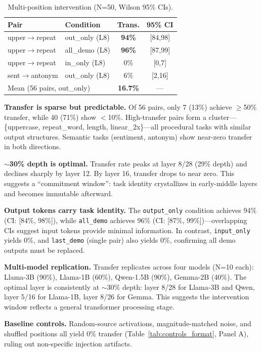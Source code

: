 \documentclass[sigconf,anonymous]{acmart}
\begin{document}
\begin{table}[t]
\caption{Multi-position intervention (N=50, Wilson 95\% CIs).}
\label{tab:multi}
\centering
\small
\begin{tabular}{@{}llcc@{}}
\toprule
Pair & Condition & Trans. & 95\% CI \\
\midrule
upper$\to$repeat & out\_only (L8) & \textbf{94\%} & [84,98] \\
upper$\to$repeat & all\_demo (L8) & \textbf{96\%} & [87,99] \\
upper$\to$repeat & in\_only (L8) & 0\% & [0,7] \\
sent$\to$antonym & out\_only (L8) & 6\% & [2,16] \\
\midrule
\multicolumn{2}{l}{Mean (56 pairs, out\_only)} & \textbf{16.7\%} & --- \\
\bottomrule
\end{tabular}
\end{table}

\textbf{Transfer is sparse but predictable.} Of 56 pairs, only 7 (13\%) achieve $\geq$50\% transfer, while 40 (71\%) show $<$10\%. High-transfer pairs form a cluster---\{uppercase, repeat\_word, length, linear\_2x\}---all procedural tasks with similar output structures. Semantic tasks (sentiment, antonym) show near-zero transfer in both directions.

\textbf{$\sim$30\% depth is optimal.} Transfer rate peaks at layer 8/28 (29\% depth) and declines sharply by layer 12. By layer 16, transfer drops to near zero. This suggests a ``commitment window'': task identity crystallizes in early-middle layers and becomes immutable afterward.

\textbf{Output tokens carry task identity.} The \texttt{output\_only} condition achieves 94\% (CI: [84\%, 98\%]), while \texttt{all\_demo} achieves 96\% (CI: [87\%, 99\%])---overlapping CIs suggest input tokens provide minimal information. In contrast, \texttt{input\_only} yields 0\%, and \texttt{last\_demo} (single pair) also yields 0\%, confirming all demo outputs must be replaced.

\textbf{Multi-model replication.} Transfer replicates across four models (N=10 each): Llama-3B (90\%), Llama-1B (60\%), Qwen-1.5B (90\%), Gemma-2B (40\%). The optimal layer is consistently at $\sim$30\% depth: layer 8/28 for Llama-3B and Qwen, layer 5/16 for Llama-1B, layer 8/26 for Gemma. This suggests the intervention window reflects a general transformer processing stage.

\textbf{Baseline controls.} Random-source activations, magnitude-matched noise, and shuffled positions all yield 0\% transfer (Table~\ref{tab:controls_format}, Panel A), ruling out non-specific injection artifacts.
\end{document}
